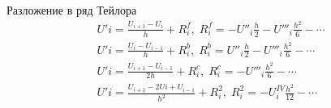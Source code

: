 \documentclass[12pt]{beamer}
\begin{document}
\begin{frame}{Разложение в ряд Тейлора}
\begin{eqnarray}
U'{i}=\frac{U_{i+1}-U_{i}}{h}+R^f_{i},\; R^f_{i}=-U''_{i}\frac{h}{2}-U'''_{i}\frac{h^2}{6}-\cdots\\
U'{i}=\frac{U_{i}-U_{i-1}}{h}+R^b_{i},\; R^b_{i}=U''_{i}\frac{h}{2}-U'''_{i}\frac{h^2}{6}-\cdots\\
U'{i}=\frac{U_{i+1}-U_{i-1}}{2h}+R^c_{i},\; R^c_{i}=-U'''_{i}\frac{h^2}{6}-\cdots\\
U'{i}=\frac{U_{i+1}-2U{i}+U_{i-1}}{h^2}+R^2_{i},\; R^2_{i}=-U^{IV}_{i}\frac{h^2}{12}-\cdots
\end{eqnarray}
\end{frame}
\end{document}

